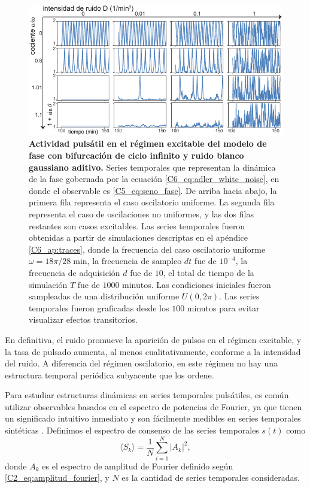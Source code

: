 \documentclass[./main.tex]{subfiles}
\begin{document}
 \begin{figure}
    \centering
    \includegraphics[width=1\columnwidth]{figures/chapter6/C6_traces.pdf} 
    \caption{\textbf{Actividad pulsátil en el régimen excitable del modelo de fase con bifurcación de ciclo infinito y ruido blanco gaussiano aditivo.} Series temporales que representan la dinámica de la fase gobernada por la ecuación \ref{C6_eq:adler_white_noise}, en donde el observable es \ref{C5_eq:seno_fase}. De arriba hacia abajo, la primera fila representa el caso oscilatorio uniforme. La segunda fila representa el caso de oscilaciones no uniformes, y las dos filas restantes son casos excitables. Las series temporales fueron obtenidas a partir de simulaciones descriptas en el apéndice \ref{C6_ap:traces}, donde la frecuencia del caso oscilatorio uniforme $\omega = 18\pi/28 \; \text{min}$, la frecuencia de sampleo $dt$ fue de $10^{-4}$, la frecuencia de adquisición $d$ fue de $10$, el total de tiempo de la simulación $T$ fue de $1000$ minutos. Las condiciones iniciales fueron sampleadas de una distribución uniforme $U(0,2\pi)$. Las series temporales fueron graficadas desde los $100$ minutos para evitar visualizar efectos transitorios.}
    \label{C6_fig:traces} 
\end{figure}


En definitiva, el ruido promueve la aparición de pulsos en el régimen excitable, y la tasa de pulsado aumenta, al menos cualitativamente, conforme a la intensidad del ruido. A diferencia del régimen oscilatorio, en este régimen no hay una estructura temporal periódica subyacente que los ordene. 

Para estudiar estructuras dinámicas en series temporales pulsátiles, es común utilizar observables basados en el espectro de potencias de Fourier, ya que tienen un significado intuitivo inmediato y son fácilmente medibles en series temporales sintéticas \cite{Gammaitoni1998}. Definimos el espectro de consenso de las series temporales $s(t)$ como \cite{Ditzinger1994}
\begin{equation}
    \langle S_k \rangle = \frac{1}{N} \sum_{i=1}^N |A_k|^2,
    \label{C6_eq:espectro_consenso}
\end{equation}
donde $A_k$ es el espectro de amplitud de Fourier definido según \ref{C2_eq:amplitud_fourier}, y $N$ es la cantidad de series temporales consideradas. 
\end{document}
